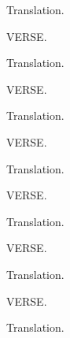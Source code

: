 \bvb Translation.\evb
\evg


\bvg
\bva VERSE.\eva

\bvb Translation.\evb
\evg


\bvg
\bva VERSE.\eva

\bvb Translation.\evb
\evg


\bvg
\bva VERSE.\eva

\bvb Translation.\evb
\evg


\bvg
\bva VERSE.\eva

\bvb Translation.\evb
\evg


\bvg
\bva VERSE.\eva

\bvb Translation.\evb
\evg


\bvg
\bva VERSE.\eva

\bvb Translation.\evb
\evg
